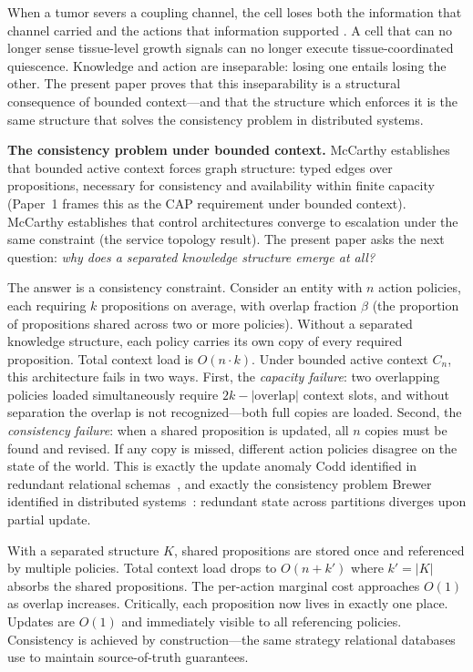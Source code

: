 \documentclass[11pt]{article}
\theoremstyle{definition}
\theoremstyle{remark}
\begin{document}
When a tumor severs a coupling channel, the cell loses both the
information that channel carried and the actions that information
supported \cite{McCarthy2026e}. A cell that can no longer sense
tissue-level growth signals can no longer execute tissue-coordinated
quiescence. Knowledge and action are inseparable: losing one entails
losing the other. The present paper proves that this inseparability
is a structural consequence of bounded context---and that the
structure which enforces it is the same structure that solves the
consistency problem in distributed systems.

\textbf{The consistency problem under bounded context.}
McCarthy \cite{McCarthy2026a} establishes that bounded active context
forces graph structure: typed edges over propositions, necessary for
consistency and availability within finite capacity
(Paper~1 frames this as the CAP requirement under bounded context).
McCarthy \cite{McCarthy2026c} establishes that control architectures
converge to escalation under the same constraint (the service topology
result). The present paper asks the next question: \emph{why does a
separated knowledge structure emerge at all?}

The answer is a consistency constraint. Consider an entity with $n$
action policies, each requiring $k$ propositions on average, with
overlap fraction $\beta$ (the proportion of propositions shared across
two or more policies). Without a separated knowledge structure, each
policy carries its own copy of every required proposition. Total
context load is $O(n \cdot k)$. Under bounded active context $C_n$,
this architecture fails in two ways. First, the \emph{capacity
failure}: two overlapping policies loaded simultaneously require
$2k - |\text{overlap}|$ context slots, and without separation the
overlap is not recognized---both full copies are loaded. Second, the
\emph{consistency failure}: when a shared proposition is updated, all
$n$ copies must be found and revised. If any copy is missed, different
action policies disagree on the state of the world. This is exactly
the update anomaly Codd identified in redundant relational
schemas~\cite{Codd1970}, and exactly the consistency problem Brewer
identified in distributed systems~\cite{Brewer2000}: redundant state
across partitions diverges upon partial update.

With a separated structure $K$, shared propositions are stored once and
referenced by multiple policies. Total context load drops to
$O(n + k')$ where $k' = |K|$ absorbs the shared propositions. The
per-action marginal cost approaches $O(1)$ as overlap increases.
Critically, each proposition now lives in exactly one place. Updates
are $O(1)$ and immediately visible to all referencing policies.
Consistency is achieved by construction---the same strategy relational
databases use to maintain source-of-truth guarantees.
\end{document}

